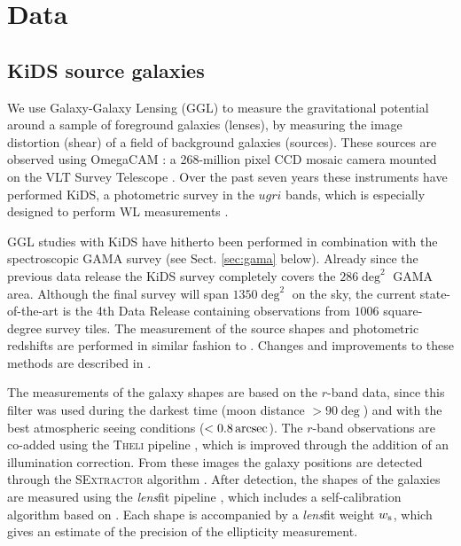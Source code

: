 \documentclass[usenatbib]{mnras}
\newcommand{\as}{\, {\rm arcsec}}
\newcommand{\un}[1]{_{\rm #1}}
\begin{document}
\section{Data}
\label{sec:data}

\subsection{KiDS source galaxies}
\label{sec:kids}

We use Galaxy-Galaxy Lensing (GGL) to measure the gravitational potential around a sample of foreground galaxies (lenses), by measuring the image distortion (shear) of a field of background galaxies (sources). These sources are observed using OmegaCAM \cite[]{kuijken2011}: a 268-million pixel CCD mosaic
camera mounted on the VLT Survey Telescope \cite[]{capaccioli2011}. Over the past seven years these instruments have performed KiDS, a photometric survey in the $ugri$ bands, which is especially designed to perform WL measurements \cite[]{dejong2013}.

GGL studies with KiDS have hitherto been performed in combination with the spectroscopic GAMA survey (see Sect. \ref{sec:gama} below). Already since the previous data release \cite[KiDS-DR3,][]{dejong2017} the KiDS survey completely covers the $286 \deg^2$ GAMA area. Although the final survey will span $1350 \deg^2$ on the sky, the current state-of-the-art is the 4th Data Release \cite[KiDS-DR4,][]{kuijken2019} containing observations from $1006$ square-degree survey tiles. The measurement of the source shapes and photometric redshifts are performed in similar fashion to \cite{dejong2017}. Changes and improvements to these methods are described in \cite{kuijken2019}. 

The measurements of the galaxy shapes are based on the $r$-band data, since this filter was used during the darkest time (moon distance $> 90 \deg$) and with the best atmospheric seeing conditions ($<0.8 \as$). The $r$-band observations are co-added using the {\scshape Theli} pipeline \cite[]{erben2013}, which is improved through the addition of an illumination correction. From these images the galaxy positions are detected through the {\scshape SExtractor} algorithm \cite[]{bertin1996}. After detection, the shapes of the galaxies are measured using the \emph{lens}fit pipeline \cite[]{miller2007,miller2013}, which includes a self-calibration algorithm based on \cite{fenechconti2017}. Each shape is accompanied by a \emph{lens}fit weight $w\un{s}$, which gives an estimate of the precision of the ellipticity measurement.
\end{document}
